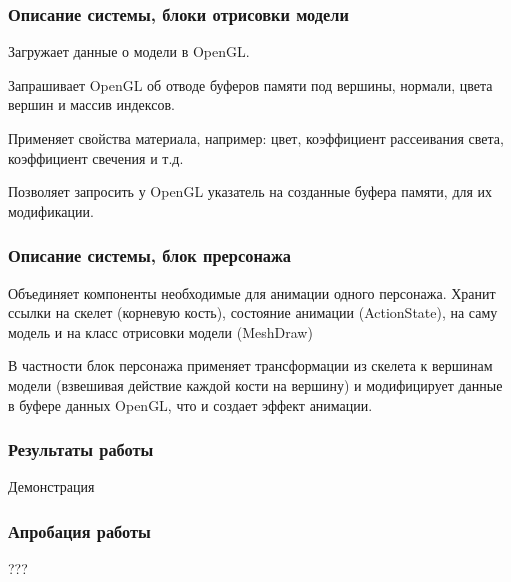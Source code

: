 \documentclass{beamer}
\begin{document}
\begin{frame}
\frametitle{Описание системы, блоки отрисовки модели}
	Загружает данные о модели в OpenGL.
	
    \smallskip
	Запрашивает OpenGL об отводе буферов памяти под вершины, нормали, цвета вершин и массив индексов.
    
    \smallskip
    Применяет свойства материала, например: цвет, коэффициент рассеивания света, коэффициент свечения и т.д.
    
    \smallskip
    Позволяет запросить у OpenGL указатель на созданные буфера памяти, для их модификации.
\end{frame}


\begin{frame}
\frametitle{Описание системы, блок прерсонажа}
    Объединяет компоненты необходимые для анимации одного персонажа. Хранит ссылки на скелет (корневую кость), состояние анимации (ActionState), на саму модель и на класс отрисовки модели (MeshDraw)
    
    \medskip
    В частности блок персонажа применяет трансформации из скелета к вершинам модели (взвешивая действие каждой кости на вершину) и модифицирует данные в буфере данных OpenGL, что и создает эффект анимации.

\end{frame}




\begin{frame}
\frametitle{Результаты работы}
    \begin{center}            
    \begin{large}
    Демонстрация
    \end{large}
    \end{center}
\end{frame}



\begin{frame}
\frametitle{Апробация работы}
    \begin{center}            
    \begin{large}
    ???
    \end{large}
    \end{center}
\end{frame}
\end{document}
